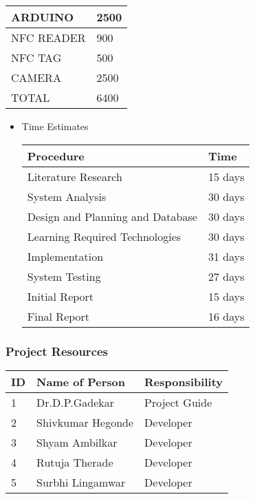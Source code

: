 \documentclass[10pt,a4paper]
{article}
\numberwithin{table}{section}
\begin{document}
{{\begin{normalsize}
\begin{itemize}
\begin{enumerate}
\end{enumerate}
\end{itemize}
\begin{table}[hbtp]
\begin{center}
\begin{tabular}{|p{200pt}|p{100pt} |}
\hline
ARDUINO & 2500 \\ \hline
NFC READER& 900 \\ \hline
NFC TAG & 500 \\ \hline
CAMERA & 2500 \\ \hline
TOTAL & 6400 \\
\hline

\end{tabular}
\end{center}
\end{table}
\begin{itemize}
\item {Time Estimates}
\begin{table}[hbtp]
\begin{center}
\begin{tabular}{|p{200pt}|p{100pt} |}
\hline
Procedure & Time \\ \hline
Literature Research & 15 days \\ \hline 
System Analysis & 30 days \\ \hline
Design and Planning and Database & 30 days \\ \hline 
Learning Required Technologies & 30 days \\ \hline 
Implementation & 31 days \\ \hline 
System Testing & 27 days  \\ \hline
Initial Report & 15 days \\ \hline
Final Report & 16 days\\ 

\hline
\end{tabular}
\end{center}
\end{table}
\end{itemize}
\subsubsection{Project Resources}
\begin{table}[hbtp]
\begin{center}
\begin{tabular}{|p{15pt}|p{137pt} | p{137pt} |}
\hline
{ID} & {Name of Person}	& {Responsibility} \\ \hline
1 & Dr.D.P.Gadekar & Project Guide\\
\hline
2 & Shivkumar Hegonde & Developer \\
\hline
3 & Shyam Ambilkar & Developer \\
\hline
4 & Rutuja Therade& Developer \\
\hline
5 & Surbhi Lingamwar & Developer \\
\hline 
\end{tabular}
\end{center}
\end{table}


\end{normalsize}}}
\end{document}
